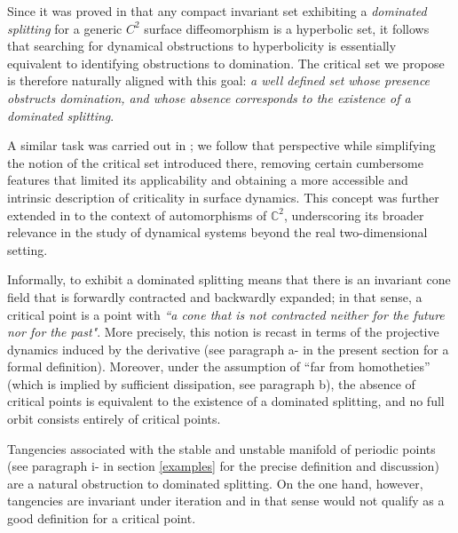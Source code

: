 \documentclass[a4paper,11pt]{article}
\theoremstyle{definition}
\begin{document}
Since it was proved in \cite{PS1} that any compact invariant set exhibiting a {\it dominated splitting} for a generic $C^2$ surface diffeomorphism is a hyperbolic set, it follows that searching for dynamical obstructions to hyperbolicity is essentially equivalent to identifying obstructions to domination. The critical set we propose is therefore naturally aligned with this goal: {\it a well defined set whose presence obstructs domination, and whose absence corresponds to  the existence of a dominated splitting}.

A similar task was carried out in \cite{PRH}; we follow that perspective while simplifying the notion of the critical set introduced there, removing certain cumbersome features that limited its applicability and obtaining a more accessible and intrinsic description of criticality in surface dynamics. 
This concept was further extended in \cite{V} to the context of automorphisms of $\mathbb{C}^2$, underscoring its broader relevance in the study of dynamical systems beyond the real two-dimensional setting.



Informally, to exhibit a dominated splitting means that there is an invariant cone field that is forwardly contracted and backwardly expanded; in that sense, a critical point is a point with {\it ``a cone that is not contracted neither for the future nor for the past"}. More precisely, this notion is recast in terms of the projective dynamics induced by the derivative (see paragraph a- in the present section for a formal definition). Moreover, under the assumption of ``far from homotheties'' (which is implied by sufficient dissipation, see paragraph b), the absence of critical points is equivalent to the existence of a dominated splitting, and no full orbit consists entirely of critical points.

 

 
Tangencies associated with the stable and unstable manifold of periodic points (see paragraph i- in section \ref{examples} for the precise definition and discussion) are a natural obstruction to dominated splitting. On the one hand, however, tangencies are invariant under iteration and in that sense would not qualify as a good definition for a critical point. 
\end{document}
